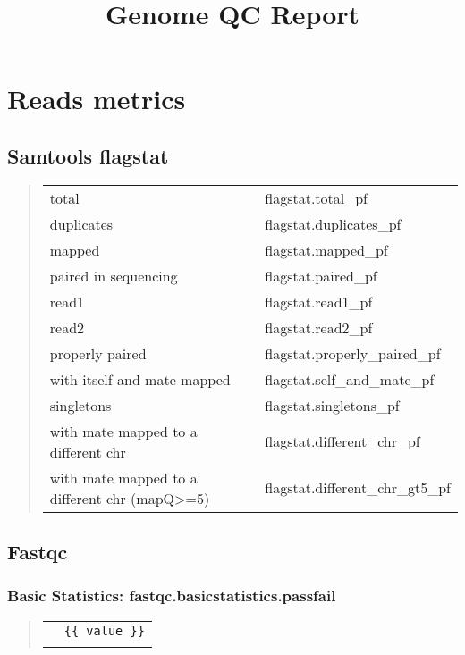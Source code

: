 \documentclass[a4paper,12pt]{article}
\begin{document}
\title{Genome QC Report}
\date{}
\author{}
\maketitle

\section*{Reads metrics}
\subsection*{Samtools flagstat}

\begin{quote}
\begin{tabular}{ll}
total&{{ flagstat.total_pf }}\\
duplicates&{{ flagstat.duplicates_pf }}\\
mapped&{{ flagstat.mapped_pf }}\\
paired in sequencing&{{ flagstat.paired_pf }}\\
read1&{{ flagstat.read1_pf }}\\
read2&{{ flagstat.read2_pf }}\\
properly paired&{{ flagstat.properly_paired_pf }}\\
with itself and mate mapped&{{ flagstat.self_and_mate_pf }}\\
singletons&{{ flagstat.singletons_pf }}\\
with mate mapped to a different chr&{{ flagstat.different_chr_pf }}\\
with mate mapped to a different chr (mapQ\textgreater=5)&{{ flagstat.different_chr_gt5_pf }}\\
\end{tabular}
\end{quote}

\subsection*{Fastqc}
\subsubsection*{Basic Statistics: {{ fastqc.basicstatistics.passfail }} }
\begin{quote}
\begin{tabular}{ll}
{%
\verb|{{ key }}|&\verb|{{ value }}|\\
{%
\end{tabular}
\end{quote}
\end{document}
